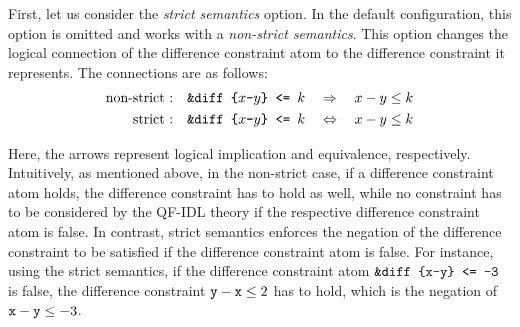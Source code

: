 First, let us consider the \emph{strict semantics} option.
In the default configuration, this option is omitted and  works with a \emph{non-strict semantics}.
This option changes the logical connection of the difference constraint atom to the difference constraint it represents.
The connections are as follows:
\begin{align*}
 \text{non-strict :}\quad&\texttt{\&diff\text{ }\{$x$-$y$\}\text{ }<=\text{ }$k$} \quad\Rightarrow\quad x-y\leq k\\
 \text{strict :}\quad&\texttt{\&diff\text{ }\{$x$-$y$\}\text{ }<=\text{ }$k$}\quad \Leftrightarrow \quad x-y\leq k
\end{align*}

Here, the arrows represent logical implication and equivalence, respectively.
Intuitively, as mentioned above, in the non-strict case, 
if a difference constraint atom holds, the difference constraint has to hold as well,
while no constraint has to be considered by the QF-IDL theory if the respective difference constraint atom is false.
In contrast, strict semantics enforces the negation of the difference constraint to be satisfied if the difference constraint atom is false.
For instance, using the strict semantics, if the difference constraint atom $\texttt{\&diff\text{ }\{x-y\}\text{ }<=\text{ }-3}$ is false,
the difference constraint $\texttt{y}-\texttt{x}\leq 2$ has to hold, which is the negation of $\texttt{x}-\texttt{y} \leq -3$.

